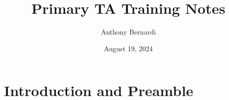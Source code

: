 \documentclass[12pt, letterpaper]{article}
\title{Primary TA Training Notes}
\author{Anthony Bernardi}
\date{August 19, 2024}
\begin{document}
\maketitle

\section{Introduction and Preamble}
\end{document}
